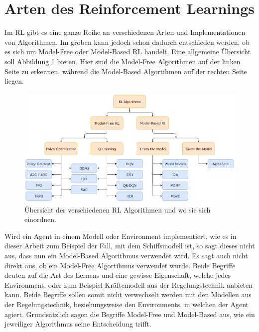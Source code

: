 \documentclass[]{iat}
\begin{document}
\section{Arten des Reinforcement Learnings} \label{sec:arten_rf}
Im RL gibt es eine ganze Reihe an verschiedenen Arten und Implementationen von Algorithmen. Im groben kann jedoch schon dadurch entschieden werden, ob es sich um Model-Free oder Model-Based RL handelt. Eine allgemeine Übersicht soll Abbildung \ref{abb:rl_overview} bieten. Hier sind die Model-Free Algorithmen auf der linken Seite zu erkennen, während die Model-Based Algortihmen auf der rechten Seite liegen.
\begin{figure}[H]
    \includegraphics[width=\textwidth]{graphics/rl_overview.png}
    \centering
    \caption{Übersicht der verschiedenen RL Algorithmen und wo sie sich einordnen. \cite[]{SpinningUp2018}}
    \label{abb:rl_overview}
\end{figure}
Wird ein Agent in einem Modell oder Environment implementiert, wie es in dieser Arbeit zum Beispiel der Fall, mit dem Schiffsmodell ist, so sagt dieses nicht aus, dass nun ein Model-Based Algorithmus verwendet wird. Es sagt auch nicht direkt aus, ob ein Model-Free Algortihmus verwendet wurde. Beide Begriffe deuten auf die Art des Lernens und eine gewisse Eigenschaft, welche jedes Environment, oder zum Beispiel Kräftemodell aus der Regelungstechnik anbieten kann. Beide Begriffe sollen somit nicht verwechselt werden mit den Modellen aus der Regelungstechnik, beziehungsweise den Environments, in welchen der Agent agiert. Grundsätzlich sagen die Begriffe Model-Free und Model-Based aus, wie ein jeweiliger Algorithmus seine Entscheidung trifft.
\end{document}
